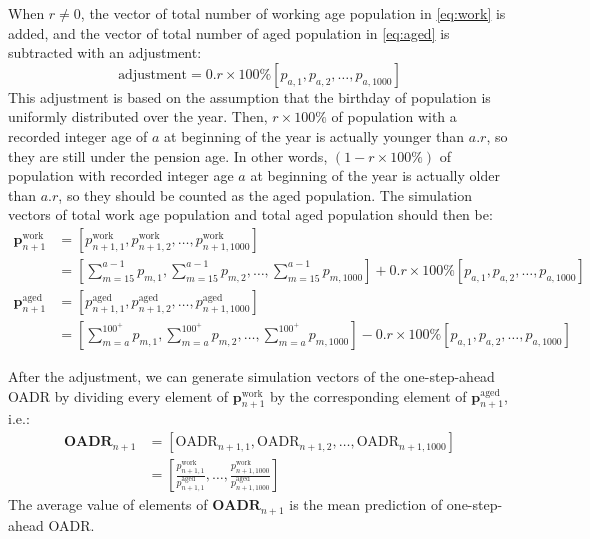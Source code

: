 \documentclass[11pt,a4paper,]{article}
\begin{document}
When \(r\neq0\), the vector of total number of working age population in \eqref{eq:work} is added, and the vector of total number of aged population in \eqref{eq:aged} is subtracted with an adjustment:
\vspace{-.2in}
\begin{equation}
  \text{adjustment}=0.r\times100\%[p_{a,1},p_{a,2},\dots,p_{a,1000}]
\end{equation}
This adjustment is based on the assumption that the birthday of population is uniformly distributed over the year. Then, \(r\times100\%\) of population with a recorded integer age of \(a\) at beginning of the year is actually younger than \(a.r\), so they are still under the pension age. In other words, \((1-r\times100\%)\) of population with recorded integer age \(a\) at beginning of the year is actually older than \(a.r\), so they should be counted as the aged population. The simulation vectors of total work age population and total aged population should then be:
\begin{align*}
  \bm{p}^{\text{work}}_{n+1}
    & = \left[p^{\text{work}}_{n+1,1},p^{\text{work}}_{n+1,2},\dots,p^{\text{work}}_{n+1,1000}\right]\\
    & = \left[\sum_{m=15}^{a-1}p_{m,1},\sum_{m=15}^{a-1}p_{m,2},\dots,\sum_{m=15}^{a-1}p_{m,1000}\right]+0.r\times100\%\left[p_{a,1},p_{a,2},\dots,p_{a,1000}\right]   \\
  \bm{p}^{\text{aged}}_{n+1}
    & = \left[p^{\text{aged}}_{n+1,1},p^{\text{aged}}_{n+1,2},\dots,p^{\text{aged}}_{n+1,1000}\right]\\
    & = \left[\sum_{m=a}^{100^+}p_{m,1},\sum_{m=a}^{100^+}p_{m,2},\dots,\sum_{m=a}^{100^+}p_{m,1000}\right]-0.r\times100\%\left[p_{a,1},p_{a,2},\dots,p_{a,1000}\right]
\end{align*}

After the adjustment, we can generate simulation vectors of the one-step-ahead OADR by dividing every element of \(\bm{p}^{\text{work}}_{n+1}\) by the corresponding element of \(\bm{p}^{\text{aged}}_{n+1}\), i.e.:
\vspace{-.3in}
\begin{align*}
  \bm{\text{OADR}}_{n+1} & = \left[\text{OADR}_{n+1,1},\text{OADR}_{n+1,2},\dots,\text{OADR}_{n+1,1000}\right]\\
                  & = \left[\frac{p^{\text{work}}_{n+1,1}}{p^{\text{aged}}_{n+1,1}},\dots,\frac{p^{\text{work}}_{n+1,1000}}{p^{\text{aged}}_{n+1,1000}}\right]
\end{align*}
The average value of elements of \(\bm{\text{OADR}}_{n+1}\) is the mean prediction of one-step-ahead OADR.
\end{document}
